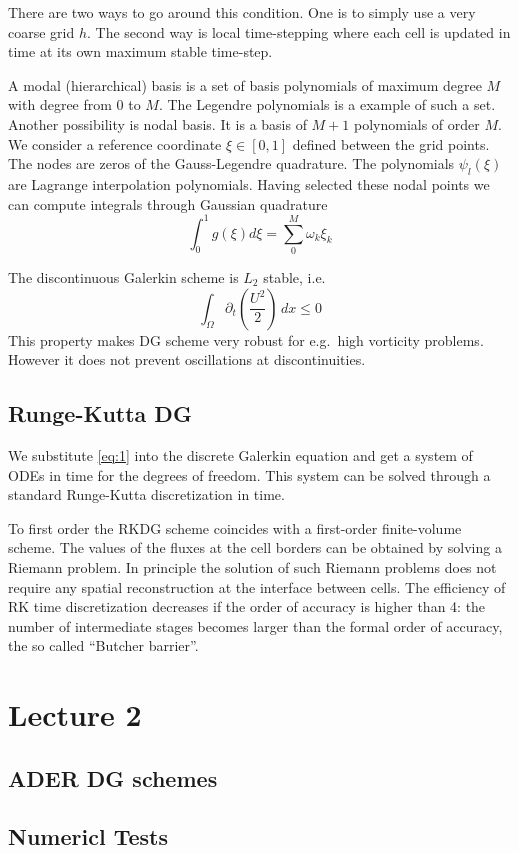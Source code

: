 \documentclass[letterpaper, 11pt]{article}
\numberwithin{equation}{section}
\numberwithin{figure}{section}
\begin{document}
There are two ways to go around this condition. One is to simply use a very
coarse grid $h$. The second way is local time-stepping where each cell is
updated in time at its own maximum stable time-step.

A modal (hierarchical) basis is a set of basis polynomials of maximum degree $M$
with degree from 0 to $M$. The Legendre polynomials is a example of such a set.
Another possibility is nodal basis. It is a basis of $M + 1$ polynomials of
order $M$. We consider a reference coordinate $\xi\in [0, 1]$ defined between
the grid points. The nodes are zeros of the Gauss-Legendre quadrature. The
polynomials $\psi_l(\xi)$ are Lagrange interpolation polynomials. Having
selected these nodal points we can compute integrals through Gaussian quadrature
\begin{equation}
  \label{eq:7}
  \int_0^1g(\xi)d\xi = \sum_0^M\omega_k\xi_k
\end{equation}

The discontinuous Galerkin scheme is $L_2$ stable, i.e.\
\begin{equation}
  \label{eq:8}
  \int_{\Omega} \partial_t \left( \frac{U^2}{2} \right)\,dx \leq 0
\end{equation}
This property makes DG scheme very robust for e.g.\ high vorticity problems.
However it does not prevent oscillations at discontinuities.

\subsection{Runge-Kutta DG}

We substitute \eqref{eq:1} into the discrete Galerkin equation and get a system
of ODEs in time for the degrees of freedom. This system can be solved through a
standard Runge-Kutta discretization in time.

To first order the RKDG scheme coincides with a first-order finite-volume
scheme. The values of the fluxes at the cell borders can be obtained by solving
a Riemann problem. In principle the solution of such Riemann problems does not
require any spatial reconstruction at the interface between cells. The
efficiency of RK time discretization decreases if the order of accuracy is
higher than 4: the number of intermediate stages becomes larger than the formal
order of accuracy, the so called ``Butcher barrier''.

\section{Lecture 2}

\subsection{ADER DG schemes}

\subsection{Numericl Tests}
\end{document}
